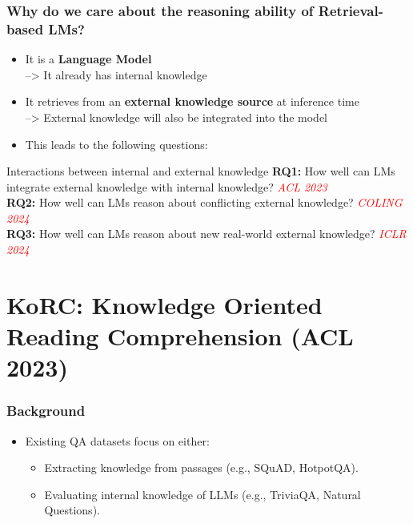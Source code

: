 \documentclass{beamer}
\newcommand{\red}[1]{\textcolor{red}{#1}}
\begin{document}
\begin{frame}
    \frametitle{Why do we care about the reasoning ability of Retrieval-based LMs?}
    \begin{itemize}
        \item It is a \textbf{Language Model} \\
         --> It already has internal knowledge
        \item It retrieves from an \textbf{external knowledge source} at inference time \\
         --> External knowledge will also be integrated into the model
        \item This leads to the following questions:
    \end{itemize}
    \begin{block}{Interactions between internal and external knowledge}
        \textbf{RQ1:} How well can LMs integrate external knowledge with internal knowledge? \textit{\red{ACL 2023}} \\
        \textbf{RQ2:} How well can LMs reason about conflicting external knowledge? \textit{\red{COLING 2024}} \\
        \textbf{RQ3:} How well can LMs reason about new real-world external knowledge? \textit{\red{ICLR 2024}}
    \end{block}
\end{frame}


\section{KoRC: Knowledge Oriented Reading Comprehension (ACL 2023)}

\begin{frame}
\frametitle{Background}
\begin{itemize}
    \item Existing QA datasets focus on either:
    \begin{itemize}
        \item Extracting knowledge from passages (e.g., SQuAD, HotpotQA).
        \item Evaluating internal knowledge of LLMs (e.g., TriviaQA, Natural Questions).
    \end{itemize}
\end{itemize}

\end{frame}
\end{document}
